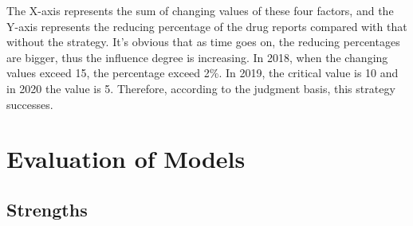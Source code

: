 \documentclass{mcmthesis}
\numberwithin{equation}{section}
\numberwithin{figure}{section}
\numberwithin{table}{section}
\theoremstyle{mydef}
\begin{document}

The X-axis represents the sum of changing values of these four factors, and the Y-axis represents the reducing percentage of the drug reports compared with that without the strategy. It's obvious that as time goes on, the reducing percentages are bigger, thus the influence degree is increasing. In 2018, when the changing values exceed 15, the percentage exceed 2\%. In 2019, the critical value is 10 and in 2020 the value is 5. Therefore, according to the judgment basis, this strategy successes.


\section{Evaluation of Models}

\subsection{Strengths}
\end{document}
